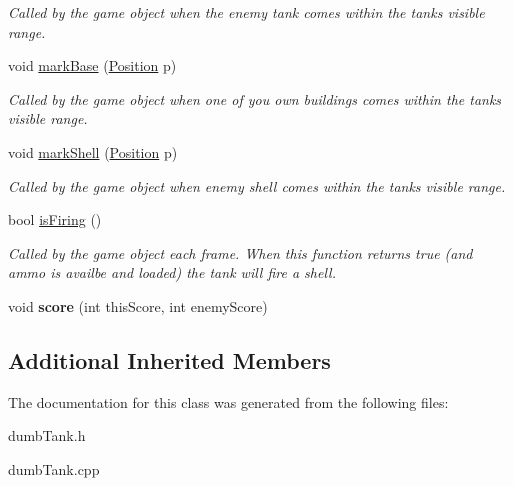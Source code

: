 \begin{DoxyCompactItemize}
\begin{DoxyCompactList}\small\item\em Called by the game object when the enemy tank comes within the tanks visible range. \end{DoxyCompactList}\item 
\mbox{\label{class_dumb_tank_ac2c8fe2a13fe009676580b33be241f59}} 
void \mbox{\hyperlink{class_dumb_tank_ac2c8fe2a13fe009676580b33be241f59}{mark\+Base}} (\mbox{\hyperlink{class_position}{Position}} p)
\begin{DoxyCompactList}\small\item\em Called by the game object when one of you own buildings comes within the tanks visible range. \end{DoxyCompactList}\item 
\mbox{\label{class_dumb_tank_a1269c78542b1f504a388aa04fdecc4a8}} 
void \mbox{\hyperlink{class_dumb_tank_a1269c78542b1f504a388aa04fdecc4a8}{mark\+Shell}} (\mbox{\hyperlink{class_position}{Position}} p)
\begin{DoxyCompactList}\small\item\em Called by the game object when enemy shell comes within the tanks visible range. \end{DoxyCompactList}\item 
\mbox{\label{class_dumb_tank_ad3ee50f39f266ef72106c41d04f7062a}} 
bool \mbox{\hyperlink{class_dumb_tank_ad3ee50f39f266ef72106c41d04f7062a}{is\+Firing}} ()
\begin{DoxyCompactList}\small\item\em Called by the game object each frame. When this function returns true (and ammo is availbe and loaded) the tank will fire a shell. \end{DoxyCompactList}\item 
\mbox{\label{class_dumb_tank_a5e79dbb66117f72fa22369b4e612cc9a}} 
void {\bfseries score} (int this\+Score, int enemy\+Score)
\end{DoxyCompactItemize}
\subsection*{Additional Inherited Members}


The documentation for this class was generated from the following files\+:\begin{DoxyCompactItemize}
\item 
dumb\+Tank.\+h\item 
dumb\+Tank.\+cpp\end{DoxyCompactItemize}
